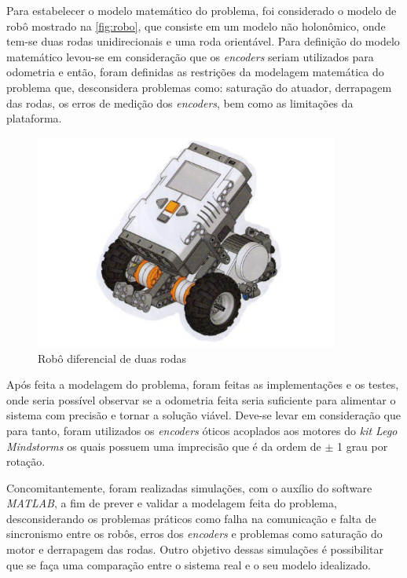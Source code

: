 Para estabelecer o modelo matemático do problema, foi considerado o modelo de robô mostrado na \autoref{fig:robo}, que consiste em um modelo não holonômico, onde tem-se duas rodas unidirecionais e uma roda orientável. Para definição do modelo matemático levou-se em consideração que os \emph{encoders} seriam utilizados para odometria e então, foram definidas as restrições da modelagem matemática do problema que, desconsidera problemas como: saturação do atuador, derrapagem das rodas, os erros de medição dos \emph{encoders}, bem como as limitações da plataforma. %

\begin{figure}[!htb]
	\centering
	\includegraphics[width=10cm]{./04-figuras/robo}
	\caption{Robô diferencial de duas rodas}
	\label{fig:robo}
\end{figure}

Após feita a modelagem do problema, foram feitas as implementações e os testes, onde seria possível observar se a odometria feita seria suficiente para alimentar o sistema com precisão e tornar a solução viável. Deve-se levar em consideração que para tanto, foram utilizados os \emph{encoders} óticos acoplados aos motores do \emph{kit Lego Mindstorms\textregistered} os quais possuem uma imprecisão que é da ordem de $\pm$ 1 grau por rotação. 

Concomitantemente, foram realizadas simulações, com o auxílio do software \emph{MATLAB\textregistered}, a fim de prever e validar a modelagem feita do problema, desconsiderando os problemas práticos como falha na comunicação e falta de sincronismo entre os robôs, erros dos \emph{encoders} e problemas como saturação do motor e derrapagem das rodas. Outro objetivo dessas simulações é possibilitar que se faça uma comparação entre o sistema real e o seu modelo idealizado.

